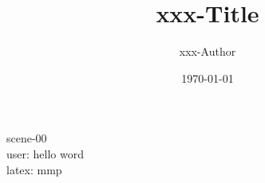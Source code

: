 \documentclass{article}
\title{xxx-Title}
\author{xxx-Author}
\date{\today}
\begin{document}
\maketitle
scene-00\\
user: hello word\\
latex: mmp
\end{document}
